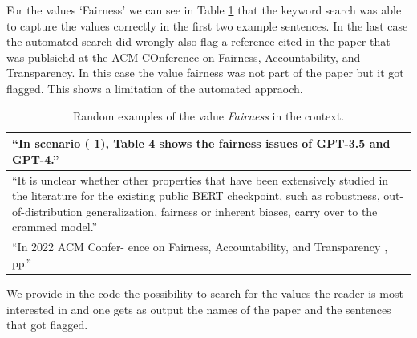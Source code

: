 \documentclass{article}
\begin{document}
For the values `Fairness' we can see in Table \ref{tab:qualitative_examples_fairness} that the keyword search was able to capture the values correctly in the first two example sentences.
In the last case the automated search did wrongly also flag a reference cited in the paper that was publsiehd at the ACM COnference on Fairness, Accountability, and Transparency. 
In this case the value fairness was not part of the paper but it got flagged. This shows a limitation of the automated appraoch. 


\begin{table}[H]
    \centering
    \begin{tabular}{p{12cm}}
        \toprule
        ``In scenario ( 1), Table 4 shows the fairness issues of GPT-3.5 and GPT-4.'' \\
        \midrule
        ``It is unclear whether other properties that have been extensively studied in the literature for the existing public BERT checkpoint, such as robustness, out-of-distribution generalization, fairness or inherent biases, carry over to the crammed model.'' \\
        \midrule
        ``In 2022 ACM Confer- ence on Fairness, Accountability, and Transparency , pp.'' \\
        \bottomrule
    \end{tabular}
    \caption{Random examples of the value \textit{Fairness} in the context.}
    \label{tab:qualitative_examples_fairness}
\end{table}

We provide in the code the possibility to search for the values the reader is most interested in and one gets 
as output the names of the paper and the sentences that got flagged. 
\end{document}
